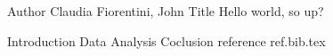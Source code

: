 Author Claudia Fiorentini, John
Title Hello world, so up?

Introduction
Data
Analysis
Coclusion
reference
ref.bib.tex
